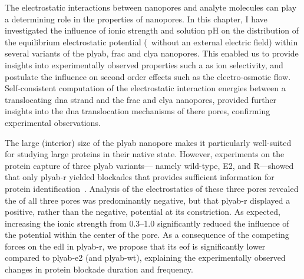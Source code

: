 The electrostatic interactions between nanopores and analyte molecules can play a determining role in the
properties of nanopores. In this chapter, I have investigated the influence of ionic strength and solution pH
on the distribution of the equilibrium electrostatic potential (\ie~without an external electric field) within
several variants of the \gls{plyab}, \gls{frac} and \gls{clya} nanopores. This enabled us to provide insights
into experimentally observed properties such a as ion selectivity, and postulate the influence on second order
effects such as the electro-osmotic flow. Self-consistent computation of the electrostatic interaction
energies between a translocating \gls{dna} strand and the \gls{frac} and \gls{clya} nanopores, provided
further insights into the \gls{dna} translocation mechanisms of there pores, confirming experimental
observations.

The large (interior) size of the \gls{plyab} nanopore makes it particularly well-suited for studying large
proteins in their native state. However, experiments on the protein capture of three \gls{plyab} variants---
namely wild-type, E2, and R---showed that only \gls{plyab-r} yielded blockades that provides sufficient
information for protein identification~\cite{Huang-2020}. Analysis of the electrostatics of these three pores
revealed the \lumen{} of all three pores was predominantly negative, but that \gls{plyab-r} displayed a
positive, rather than the negative, potential at its constriction. As expected, increasing the ionic strength
from \SIrange{0.3}{1.0}{\Molar} significantly reduced the influence of the potential within the center of the
pore. As a consequence of the competing forces on the \gls{edl} in \gls{plyab-r}, we propose that its
\gls{eof} is significantly lower compared to \gls{plyab-e2} (and \gls{plyab-wt}), explaining the
experimentally observed changes in protein blockade duration and frequency.

